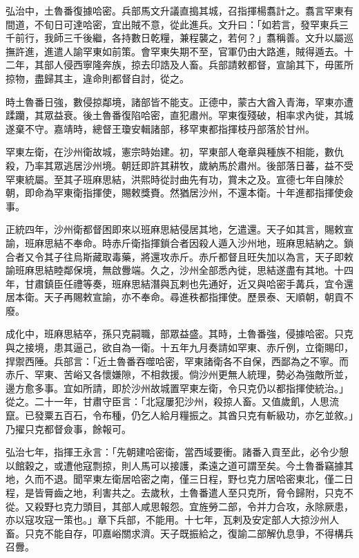 \begin{pinyinscope}
弘治中，土魯番復據哈密。兵部馬文升議直搗其城，召指揮楊翥計之。翥言罕東有間道，不旬日可達哈密，宜出賊不意，從此進兵。文升曰：「如若言，發罕東兵三千前行，我師三千後繼，各持數日乾糧，兼程襲之，若何？」翥稱善。文升以屬巡撫許進，進遣人諭罕東如前策。會罕東失期不至，官軍仍由大路進，賊得遁去。十二年，其部人侵西寧隆奔族，掠去印誥及人畜。兵部請敕都督，宣諭其下，毋匿所掠物，盡歸其主，違命則都督自討，從之。

時土魯番日強，數侵掠鄰境，諸部皆不能支。正德中，蒙古大酋入青海，罕東亦遭蹂躪，其眾益衰。後土魯番復陷哈密，直犯肅州。罕東復殘破，相率求內徙，其城遂棄不守。嘉靖時，總督王瓊安輯諸部，移罕東都指揮枝丹部落於甘州。

罕東左衛，在沙州衛故城，憲宗時始建。初，罕東部人奄章與種族不相能，數仇殺，乃率其眾逃居沙州境。朝廷即許其耕牧，歲納馬於肅州。後部落日蕃，益不受罕東統屬。至其子班麻思結，洪熙時從討曲先有功，賞未之及。宣德七年自陳於朝，即命為罕東衛指揮使，賜敕獎賚。然猶居沙州，不還本衛。十年進都指揮使僉事。

正統四年，沙州衛都督困即來以班麻思結侵居其地，乞遣還。天子如其言，賜敕宣諭，班麻思結不奉命。時赤斤衛指揮鎖合者因殺人遁入沙州地，班麻思結納之。鎖合者又令其子往烏斯藏取毒藥，將還攻赤斤。赤斤都督且旺失加以為言，天子即敕諭班麻思結睦鄰保境，無啟釁端。久之，沙州全部悉內徙，思結遂盡有其地。十四年，甘肅鎮臣任禮等奏，班麻思結潛與瓦剌也先通好，近又與哈密手冓兵，宜令還居本衛。天子再賜敕宣諭，亦不奉命。尋進秩都指揮使。歷景泰、天順朝，朝貢不廢。

成化中，班麻思結卒，孫只克嗣職，部眾益盛。其時，土魯番強，侵據哈密。只克與之接境，患其逼己，欲自為一衛。十五年九月奏請如罕東、赤斤例，立衛賜印，捍禦西陲。兵部言：「近土魯番吞噬哈密，罕東諸衛各不自保，西鄙為之不寧。而赤斤、罕東、苦峪又各懷嫌隙，不相救援。倘沙州更無人統理，勢必為強敵所並，邊方愈多事。宜如所請，即於沙州故城置罕東左衛，令只克仍以都指揮使統治。」從之。二十一年，甘肅守臣言：「北寇屢犯沙州，殺掠人畜。又值歲飢，人思流竄。已發粟五百石，令布種，仍乞人給月糧振之。其酋只克有斬級功，亦乞並敘。」乃擢只克都督僉事，餘報可。

弘治七年，指揮王永言：「先朝建哈密衛，當西域要衝。諸番入貢至此，必令少憩以館穀之，或遭他寇剽掠，則人馬可以接護，柔遠之道可謂至矣。今土魯番竊據其地，久而不退。聞罕東左衛居哈密之南，僅三日程，野乜克力居哈密東北，僅二日程，是皆脣齒之地，利害共之。去歲秋，土魯番遣人至只克所，脅令歸附，只克不從。又殺野乜克力頭目，其部人咸思報怨。宜旌勞二部，令并力合攻，永除厥患，亦以寇攻寇一策也。」章下兵部，不能用。十七年，瓦剌及安定部人大掠沙州人畜。只克不能自存，叩嘉峪關求濟。天子既振給之，復諭二部解仇息爭，不得構兵召釁。


\end{pinyinscope}
